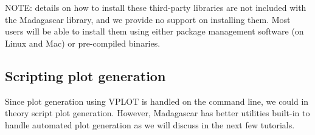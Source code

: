 NOTE: details on how to install these third-party libraries are not included with the Madagascar library, and we provide no support on installing them.  Most users will be able to install them using either package management software (on Linux and Mac) or pre-compiled binaries.

\subsection{Scripting plot generation}

Since plot generation using VPLOT is handled on the command line, we could in theory script plot generation.  However, Madagascar has better utilities built-in to handle automated plot generation as we will discuss in the next few tutorials.
